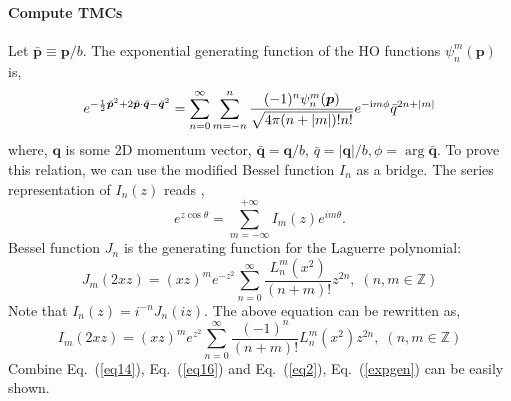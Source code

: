 \documentclass[a4paper,10pt]{article}
\newcommand{\half}[1][1] {\mathsmaller{\frac{#1}{2}}}
\newcommand{\imag} {\text{i}} %
\begin{document}
\paragraph{Compute TMCs}                

Let $\bar{\bm{p}} \equiv \bm{p}/b$. The exponential generating function of the HO functions $\psi_n^m({\bm{p}})$ is,
\begin{equation}\label{expgen}
   e^{-\half\bar{\bm p}^2 + 2\bar{\bm p}\cdot\bar{\bm q} - \bar{\bm q}^2}
= \sum_{n=0}^\infty \sum_{m=-n}^{n} \frac{(-1)^n \psi_n^m({\bm{p}})}{\sqrt{4\pi(n+|m|)!n!}}  e^{-\imag m \phi} \bar{q}^{2n+|m|}
\end{equation}
where, $\bm q$ is some 2D momentum vector, $\bar{\bm{q}} = \bm q/b$, $\bar q = |\bm{q}|/b, \phi = \arg \bar{\bm{q}}$. To prove this relation, we can use the 
modified Bessel function $I_n$ as a bridge. 
The series representation of $I_n(z)$ reads \cite{AnS.p376},
\begin{equation}\label{eq14}
 e^{z\cos\theta} = \sum_{m=-\infty}^{+\infty} I_m(z) e^{im\theta}.
\end{equation}
Bessel function $J_n$ is the generating function for the Laguerre polynomial:
\begin{equation}
 J_m(2xz) = \left(xz\right)^m e^{-z^2} \sum_{n=0}^\infty \frac{L_n^m(x^2)}{(n+m)!} z^{2n}, \; (n,m \in \mathbb{Z})
\end{equation}
Note that $I_n(z) = i^{-n} J_n(iz)$. The above equation can be rewritten as, 
\begin{equation}\label{eq16}
 I_m(2xz) = \left(xz\right)^m e^{z^2} \sum_{n=0}^\infty \frac{(-1)^n}{(n+m)!} L_n^m(x^2) z^{2n}, \; (n,m \in \mathbb{Z})
\end{equation}
Combine Eq.~(\ref{eq14}), Eq.~(\ref{eq16}) and Eq.~(\ref{eq2}), Eq.~(\ref{expgen}) can be easily shown.
\end{document}

